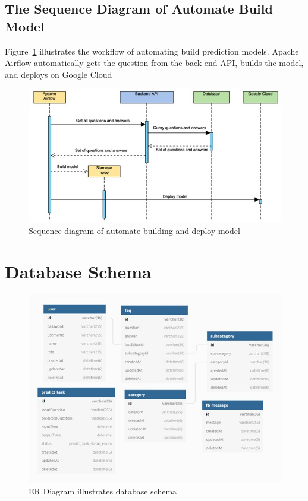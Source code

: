 \documentclass[12pt,oneside,openright,a4paper]{cpe-english-project}
\begin{document}
\pagebreak

\subsection{The Sequence Diagram of Automate Build Model}
Figure~\ref*{fig:Sequence diagram of automate building and deploy model} illustrates the workflow of automating build prediction models. Apache Airflow automatically gets the question from the back-end API, builds the model, and deploys on Google Cloud
\begin{figure}[!h]
	\includegraphics[width=14cm]{img/ch3/sequence diagram of automate build model.jpg}
	\caption{Sequence diagram of automate building and deploy model}\label{fig:Sequence diagram of automate building and deploy model}
\end{figure}

\section{Database Schema}
\label{ch2_database_schema}
\begin{figure}[!h]
	\includegraphics[width=14cm]{img/ch3/Database Schema.jpg}
	\caption{ER Diagram illustrates database schema}\label{fig:ER Diagram illustrates database schema}
\end{figure}
\end{document}
